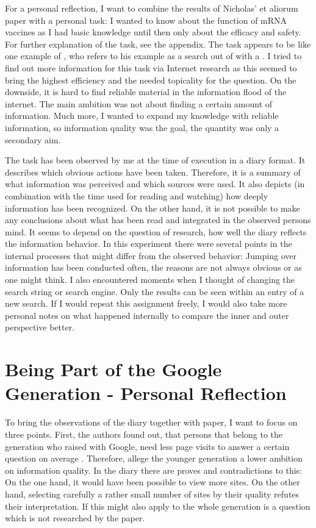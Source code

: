 \documentclass[11pt,letterpaper]{article}
\begin{document}
For a personal reflection, I want to combine the results of Nicholas' et aliorum paper with a personal task: I wanted to know about the function of mRNA vaccines as I had basic knowledge until then only about the efficacy and safety. For further explanation of the task, see the appendix. The task appears to be like one example of \cite[p. 31-33]{Case.2007}, who refers to his example as a search out of  with a . I tried to find out more information for this task via Internet research as this seemed to bring the highest efficiency and the needed topicality for the question. On the downside, it is hard to find reliable material in the information flood of the internet. The main ambition was not about finding a certain amount of information. Much more, I wanted to expand my knowledge with reliable information, so information quality was the goal, the quantity was only a secondary aim.

The task has been observed by me at the time of execution in a diary format. It describes which obvious actions have been taken. Therefore, it is a summary of what information was perceived and which sources were used. It also depicts (in combination with the time used for reading and watching) how deeply information has been recognized. On the other hand, it is not possible to make any conclusions about what has been read and integrated in the observed persons mind. It seems to depend on the question of research, how well the diary reflects the information behavior. In this experiment there were several points in the internal processes that might differ from the observed behavior: Jumping over information has been conducted often, the reasons are not always obvious or as one might think. I also encountered moments when I thought of changing the search string or search engine. Only the results can be seen within an entry of a new search. If I would repeat this assignment freely, I would also take more personal notes on what happened internally to compare the inner and outer perspective better.

\section*{Being Part of the Google Generation - Personal Reflection}
To bring the observations of the diary together with \cite{Nicholas.2011} paper, I want to focus on three points. First, the authors found out, that persons that belong to the generation who raised with Google, need less page visits to answer a certain question on average \autocite[p. 41]{Nicholas.2011}. Therefore, \cite[p. 44]{Nicholas.2011} allege the younger generation a lower ambition on information quality. In the diary there are proves and contradictions to this: On the one hand, it would have been possible to view more sites. On the other hand, selecting carefully a rather small number of sites by their quality refutes their interpretation. If this might also apply to the whole generation is a question which is not researched by the paper.
\end{document}
